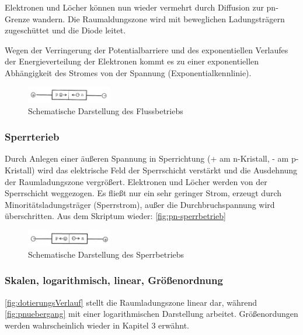     Elektronen und Löcher können nun wieder vermehrt durch Diffusion zur pn-Grenze wandern. Die Raumaldungszone wird mit beweglichen Ladungsträgern zugeschüttet und die Diode leitet. 
    
    Wegen der Verringerung der Potentialbarriere und des exponentiellen Verlaufes der Energieverteilung der Elektronen kommt es zu einer exponentiellen Abhängigkeit des Stromes von der Spannung (Exponentialkennlinie).
    
    \begin{figure}
        \centering
        \includegraphics[width=0.33\textwidth]{fig/pn-flussbetrieb.jpg}
        \caption{Schematische Darstellung des Flussbetriebs}
        \label{fig:pn-flussbetrieb}
    \end{figure}
    
    \subsubsection{Sperrterieb}
    Durch Anlegen einer äußeren Spannung in Sperrichtung (+ am n-Kristall, - am p-Kristall) wird das elektrische Feld der Sperrschicht verstärkt und die Ausdehnung der Raumladungszone vergrößert. Elektronen und Löcher werden von der Sperrschicht weggezogen. Es fließt nur ein sehr geringer Strom, erzeugt durch Minoritätsladungsträger (Sperrstrom), außer die Durchbruchspannung wird überschritten.
    Aus dem Skriptum wieder: \autoref{fig:pn-sperrbetrieb}
    \begin{figure}
        \centering
        \includegraphics[width=0.33\textwidth]{fig/pn-sperrbetrieb.jpg}
        \caption{Schematische Darstellung des Sperrbetriebs}
        \label{fig:pn-sperrbetrieb}
    \end{figure}

	\subsubsection{Skalen, logarithmisch, linear, Größenordnung}
	\autoref{fig:dotierungsVerlauf} stellt die Raumladungszone linear dar, während \autoref{fig:pnuebergang} mit einer logarithmischen Darstellung arbeitet.
	Größenordungen werden wahrscheinlich wieder in Kapitel 3 erwähnt. 
	
